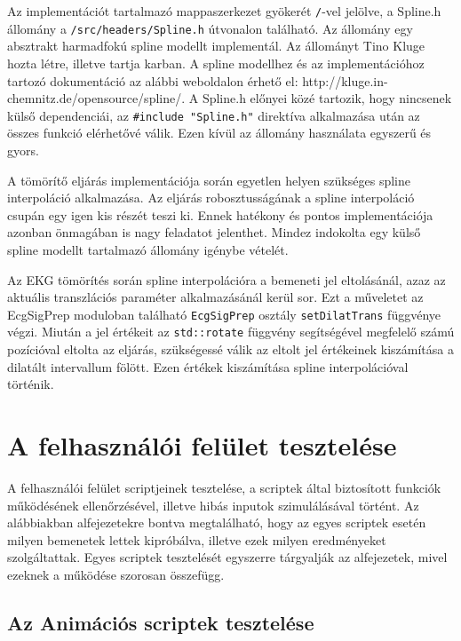 \documentclass[oneside,titlepage,12pt,a4paper]{report}
\begin{document}
Az implementációt tartalmazó mappaszerkezet gyökerét \texttt{/}-vel jelölve, a Spline.h állomány a \texttt{/src/headers/Spline.h} útvonalon található. Az állomány egy absztrakt harmadfokú spline modellt implementál. Az állományt Tino Kluge hozta létre, illetve tartja karban. A spline modellhez és az implementációhoz tartozó dokumentáció az alábbi weboldalon érhető el: http://kluge.in-chemnitz.de/opensource/spline/. A Spline.h előnyei közé tartozik, hogy nincsenek külső dependenciái, az \texttt{\#include "Spline.h"} direktíva alkalmazása után az összes funkció elérhetővé válik. Ezen kívül az állomány használata egyszerű és gyors.
\par A tömörítő eljárás implementációja során egyetlen helyen szükséges spline interpoláció alkalmazása. Az eljárás robosztusságának a spline interpoláció csupán egy igen kis részét teszi ki. Ennek hatékony és pontos implementációja azonban önmagában is nagy feladatot jelenthet. Mindez indokolta egy külső spline modellt tartalmazó állomány igénybe vételét. 
\par Az EKG tömörítés során spline interpolációra a bemeneti jel eltolásánál, azaz az aktuális transzlációs paraméter alkalmazásánál kerül sor. Ezt a műveletet az EcgSigPrep moduloban található \texttt{EcgSigPrep} osztály \texttt{setDilatTrans} függvénye végzi. Miután a jel értékeit az \texttt{std::rotate} függvény segítségével megfelelő számú pozícióval eltolta az eljárás, szükségessé válik az eltolt jel értékeinek kiszámítása a dilatált intervallum fölött. Ezen értékek kiszámítása spline interpolációval történik.

\section{A felhasználói felület tesztelése}

A felhasználói felület scriptjeinek tesztelése, a scriptek által biztosított funkciók működésének ellenőrzésével, illetve hibás inputok szimulálásával történt. Az alábbiakban alfejezetekre bontva megtalálható, hogy az egyes scriptek esetén milyen bemenetek lettek kipróbálva, illetve ezek milyen eredményeket szolgáltattak. Egyes scriptek tesztelését egyszerre tárgyalják az alfejezetek, mivel ezeknek a működése szorosan összefügg.

\subsection{Az Animációs scriptek tesztelése}
\end{document}

